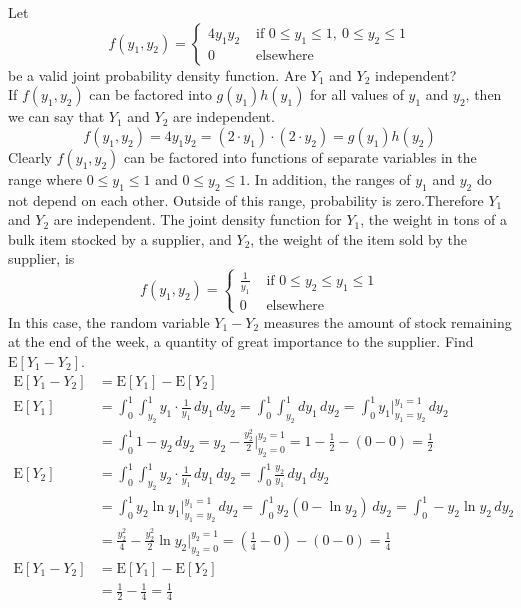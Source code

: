 \documentclass[12pt]{article}
\newcommand{\ques}[1]{\noindent {\bf Question #1: }}
\begin{document}
\ques{5.52} Let $$ f(y_1, y_2) = \begin{cases} 4y_1y_2 &\text{ if } 0 \leq y_1 \leq 1, ~ 0 \leq y_2 \leq 1 \\ 0 &\text{ elsewhere } \end{cases} $$ be a valid joint probability density function. Are $Y_1$ and $Y_2$ independent?  \\
If $f(y_1, y_2)$ can be factored into $g(y_1)h(y_1)$ for all values of $y_1$ and $y_2$, then we can say that $Y_1$ and $Y_2$ are independent.
$$ f(y_1, y_2) = 4y_1y_2 =  \left(2 \cdot y_1 \right)\cdot \left(2 \cdot y_2\right) = g(y_1)h(y_2) $$
 Clearly $f(y_1,y_2)$ can be factored into functions of separate variables in the range where $0 \leq y_1 \leq 1$ and $0 \leq y_2 \leq 1$. In addition, the ranges of $y_1$ and $y_2$ do not depend on each other. Outside of this range, probability is zero.Therefore $Y_1$ and $Y_2$ are independent. 
\newpage
\ques{5.82} The joint density function for $Y_1$, the weight in tons of a bulk item stocked by a supplier, and $Y_2$, the weight of the item sold by the supplier, is $$ f(y_1, y_2) = \begin{cases} \frac{1}{y_1} &\text{ if } 0 \leq y_2 \leq y_1 \leq 1 \\ 0 &\text{ elsewhere } \end{cases} $$ 
In this case, the random variable $Y_1 - Y_2$ measures the amount of stock remaining at the end of the week, a quantity of great importance to the supplier. Find $\mathrm{E}[Y_1 - Y_2]$. 
$$ \begin{aligned} 
\mathrm{E}[Y_1 - Y_2] &= \mathrm{E}[Y_1] - \mathrm{E}[Y_2] \\ \mathrm{E}[Y_1] &= \int_0^1 \int_{y_2}^1 y_1 \cdot \frac{1}{y_1} \, dy_1 \, dy_2 = \int_0^1 \int_{y_2}^1 dy_1 \, dy_2 = \int_0^1 y_1\Big|_{y_1 = y_2}^{y_1 = 1} \, dy_2 \\ &= \int_0^1 1 - y_2 \, dy_2 = y_2 - \frac{y_2^2}{2} \Big|_{y_2 = 0}^{y_2 = 1} = 1 - \frac{1}{2} - (0 - 0) = \frac{1}{2} \\
\mathrm{E}[Y_2] &= \int_0^1 \int_{y_2}^1 y_2 \cdot \frac{1}{y_1} \, dy_1 \, dy_2 = \int_0^1 \frac{y_2}{y_1} \, dy_1 \, dy_2 \\ &= \int_0^1 y_2 \ln y_1 \Big|_{y_1 = y_2}^{y_1 = 1} \, dy_2 = \int_0^1 y_2(0 - \ln y_2) \, dy_2 = \int_0^1 -y_2\ln y_2 \, dy_2 \\ &= \frac{y_2^2}{4} - \frac{y_2^2}{2}\ln y_2 \Big|_{y_2 = 0}^{y_2 = 1} = ( \frac{1}{4} - 0) - (0 - 0) = \frac{1}{4} \\ 
\mathrm{E}[Y_1 - Y_2] &= \mathrm{E}[Y_1] - \mathrm{E}[Y_2] \\ &= \frac{1}{2} - \frac{1}{4} = \frac{1}{4} \end{aligned} $$ 
\end{document}
